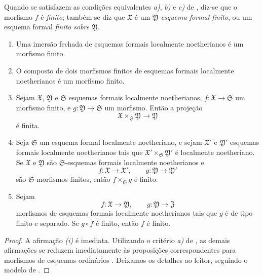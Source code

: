 \begin{definition}[4.8.2]
\label{III.4.8.2}
Quando se satisfazem as condições equivalentes \emph{a)}, \emph{b)} e \emph{c)}
de , diz-se que o morfismo $f$ é
\emph{finito}; também se diz que $\mathfrak{X}$ é um
\emph{$\mathfrak{Y}$-esquema formal finito}, ou um esquema
formal \emph{finito sobre $\mathfrak{Y}$}.
\end{definition}

\begin{proposition}[4.8.3]
\label{III.4.8.3}
\begin{enumerate}
  \item[\rm{(i)}] Uma imersão fechada de esquemas formais localmente
    noetherianos é um morfismo finito.
  \item[\rm{(ii)}] O composto de dois morfismos finitos de esquemas formais
    localmente noetherianos é um morfismo finito.
  \item[\rm{(iii)}] Sejam $\mathfrak{X}$, $\mathfrak{Y}$ e
    $\mathfrak{S}$ esquemas formais localmente noetherianos,
    $f:\mathfrak{X}\to\mathfrak{S}$ um morfismo finito, e
    $g:\mathfrak{Y}\to\mathfrak{S}$ um morfismo. Então a projeção
    \[
      \mathfrak{X}\times_{\mathfrak{S}}\mathfrak{Y}
      \longrightarrow\mathfrak{Y}
    \]
    é finita.
  \item[\rm{(iv)}] Seja $\mathfrak{S}$ um esquema formal localmente
    noetheriano, e sejam $\mathfrak{X}'$ e $\mathfrak{Y}'$
    esquemas formais localmente noetherianos tais que
    $\mathfrak{X}'\times_{\mathfrak{S}}\mathfrak{Y}'$ é localmente
    noetheriano. Se $\mathfrak{X}$ e $\mathfrak{Y}$ são
    $\mathfrak{S}$-esquemas formais localmente noetherianos e
    \[
      f:\mathfrak{X}\to\mathfrak{X}',\qquad
      g:\mathfrak{Y}\to\mathfrak{Y}'
    \]
    são $\mathfrak{S}$-morfismos finitos, então
    $f\times_{\mathfrak{S}}g$ é finito.
  \item[\rm{(v)}] Sejam
    \[
      f:\mathfrak{X}\to\mathfrak{Y},\qquad
      g:\mathfrak{Y}\to\mathfrak{Z}
    \]
    morfismos de esquemas formais localmente noetherianos tais que
    $g$ é de tipo finito e separado. Se $g\circ f$ é finito,
    então $f$ é finito.
\end{enumerate}
\end{proposition}

\begin{proof}
A afirmação \emph{(i)} é imediata. Utilizando o critério \emph{a)} de
, as demais afirmações se reduzem imediatamente às
proposições correspondentes para morfismos de esquemas ordinários
. Deixamos os detalhes ao leitor, seguindo
o modelo de .
\end{proof}


